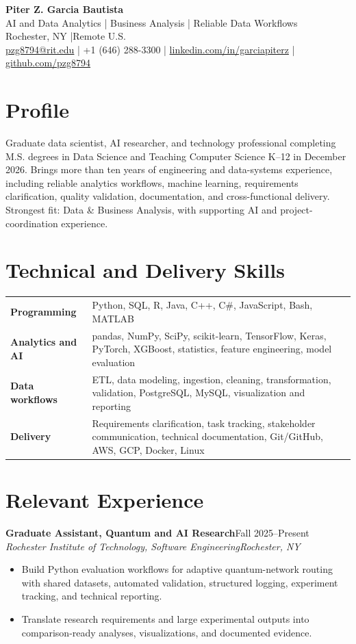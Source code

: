 \documentclass[10pt,letterpaper]{article}
\newcommand{\role}[4]{\textbf{#1}\hfill #2\\\textit{#3}\hfill\textit{#4}\vspace{-3pt}}
\begin{document}
\fontsize{9}{10.25}\selectfont
\begin{center}
{\Large\bfseries Piter Z. Garcia Bautista}\\[1pt]
{\large AI and Data Analytics | Business Analysis | Reliable Data Workflows}\\[2pt]
Rochester, NY \enspace|\enspace Remote U.S.\\
\href{mailto:pzg8794@rit.edu}{pzg8794@rit.edu} \enspace|\enspace
+1 (646) 288-3300 \enspace|\enspace
\href{https://linkedin.com/in/garciapiterz}{linkedin.com/in/garciapiterz} \enspace|\enspace
\href{https://github.com/pzg8794}{github.com/pzg8794}
\end{center}

\section*{Profile}
Graduate data scientist, AI researcher, and technology professional completing
M.S. degrees in Data Science and Teaching Computer Science K--12 in December
2026. Brings more than ten years of engineering and data-systems experience,
including reliable analytics workflows, machine learning, requirements
clarification, quality validation, documentation, and cross-functional
delivery. Strongest fit: Data \& Business Analysis, with supporting AI and
project-coordination experience.

\section*{Technical and Delivery Skills}
\begin{tabularx}{\textwidth}{@{}>{\bfseries}l X@{}}
Programming & Python, SQL, R, Java, C++, C\#, JavaScript, Bash, MATLAB\\
Analytics and AI & pandas, NumPy, SciPy, scikit-learn, TensorFlow, Keras, PyTorch, XGBoost, statistics, feature engineering, model evaluation\\
Data workflows & ETL, data modeling, ingestion, cleaning, transformation, validation, PostgreSQL, MySQL, visualization and reporting\\
Delivery & Requirements clarification, task tracking, stakeholder communication, technical documentation, Git/GitHub, AWS, GCP, Docker, Linux\\
\end{tabularx}

\section*{Relevant Experience}
\role{Graduate Assistant, Quantum and AI Research}{Fall 2025--Present}
{Rochester Institute of Technology, Software Engineering}{Rochester, NY}
\begin{itemize}
  \item Build Python evaluation workflows for adaptive quantum-network routing
  with shared datasets, automated validation, structured logging, experiment
  tracking, and technical reporting.
  \item Translate research requirements and large experimental outputs into
  comparison-ready analyses, visualizations, and documented evidence.
\end{itemize}
\end{document}
